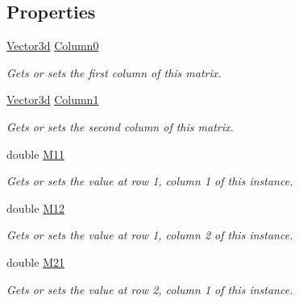 \subsection*{Properties}
\begin{DoxyCompactItemize}
\item 
\hyperlink{struct_open_t_k_1_1_vector3d}{Vector3d} \hyperlink{struct_open_t_k_1_1_matrix3x2d_a4de9eacd35e50dbfeef44c543d2b57d4}{Column0}
\begin{DoxyCompactList}\small\item\em Gets or sets the first column of this matrix. \end{DoxyCompactList}\item 
\hyperlink{struct_open_t_k_1_1_vector3d}{Vector3d} \hyperlink{struct_open_t_k_1_1_matrix3x2d_a08686c198b3aded6d646389df7f7f15b}{Column1}
\begin{DoxyCompactList}\small\item\em Gets or sets the second column of this matrix. \end{DoxyCompactList}\item 
double \hyperlink{struct_open_t_k_1_1_matrix3x2d_a23c85bab41da21113dc4977fdcfd8407}{M11}
\begin{DoxyCompactList}\small\item\em Gets or sets the value at row 1, column 1 of this instance. \end{DoxyCompactList}\item 
double \hyperlink{struct_open_t_k_1_1_matrix3x2d_a5c9e919dc563cc5fc6768c449d75382d}{M12}
\begin{DoxyCompactList}\small\item\em Gets or sets the value at row 1, column 2 of this instance. \end{DoxyCompactList}\item 
double \hyperlink{struct_open_t_k_1_1_matrix3x2d_a2c24f8339241e5b8302ba4ecdb2e7a7d}{M21}
\begin{DoxyCompactList}\small\item\em Gets or sets the value at row 2, column 1 of this instance. \end{DoxyCompactList}\item 

\end{DoxyCompactItemize}
